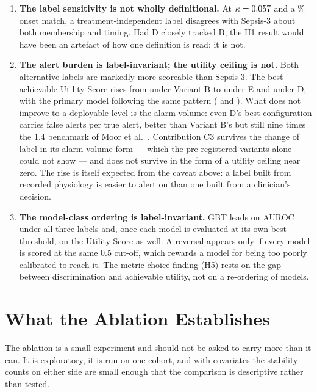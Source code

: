 \begin{enumerate}
    \item \textbf{The label sensitivity is not wholly definitional.} At
    $\kappa = 0.057$ and a \pcPctExactMatchD\% onset match, a
    treatment-independent label
    disagrees with Sepsis-3 about both membership and timing. Had D closely
    tracked B, the H1 result would have been an artefact of how one definition
    is read; it is not.

    \item \textbf{The alert burden is label-invariant; the utility ceiling is
    not.} Both alternative labels are markedly more scoreable than Sepsis-3.
    The best achievable Utility Score rises from \pcUtilityMaxGbtB{} under
    Variant B to \pcUtilityMaxGbtE{} under E and \pcUtilityMaxGbtD{} under D,
    with the primary model following the same pattern
    (\pcUtilityMaxPrimaryE{} and \pcUtilityMaxPrimaryD). What does not improve
    to a deployable level is the alarm volume: even D's best configuration
    carries \pcUtilityOptBurdenGbtD{} false alerts per true alert, better than
    Variant B's \pcUtilityOptBurdenGbtB{} but still nine times the 1.4
    benchmark of Moor et al.\ \cite{moor2023review}. Contribution C3 survives
    the change of label in its alarm-volume form --- which the pre-registered
    variants alone could not show --- and does not survive in the form of a
    utility ceiling near zero. The rise is itself expected from the caveat
    above: a label built from recorded physiology is easier to alert on than
    one built from a clinician's decision.

    \item \textbf{The model-class ordering is label-invariant.} GBT leads on
    AUROC under all three labels and, once each model is evaluated at its own
    best threshold, on the Utility Score as well. A reversal appears only if
    every model is scored at the same 0.5 cut-off, which rewards a model for
    being too poorly calibrated to reach it. The
    metric-choice finding (H5) rests on the gap between discrimination and
    achievable utility, not on a re-ordering of models.
\end{enumerate}


\section{What the Ablation Establishes}
\label{sec:ablation_establishes}

The ablation is a small experiment and should not be asked to carry more than
it can. It is exploratory, it is run on one cohort, and with \pcHTwoNTerms{}
covariates the stability counts on either side are small enough that the
comparison is descriptive rather than tested.

